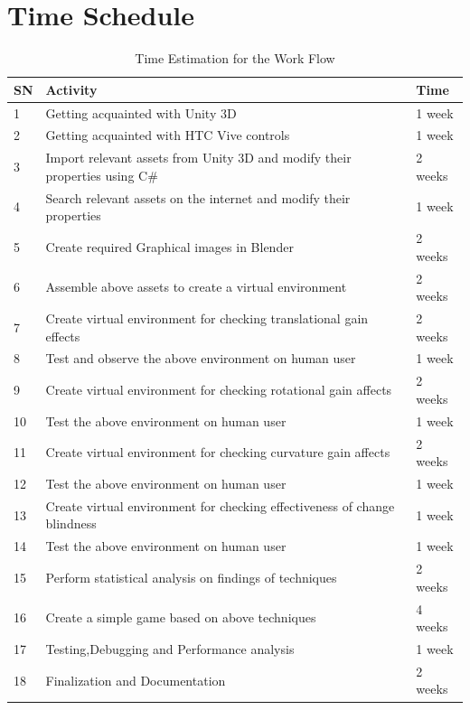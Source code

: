 \documentclass[12pt]{article}
\begin{document}
\section{Time Schedule}
\begin{table}[!ht]
\centering
\begin{tabular} { |l | l | l |}
\hline
SN & Activity & Time \\ \hline
1 & Getting acquainted with Unity 3D     &  1 week \\ \hline
2 & Getting acquainted with HTC Vive controls & 1 week \\ \hline
3 & Import relevant assets from Unity 3D and modify their properties using C\# &  2 weeks \\ \hline
4 & Search relevant assets on the internet and modify their properties & 1 week \\ \hline
5 & Create required Graphical images in Blender & 2 weeks \\ \hline
6 & Assemble above assets to create a virtual environment & 2 weeks \\ \hline
7 & Create virtual environment for checking translational gain effects & 2 weeks \\ \hline
8 & Test and observe the above environment on human user& 1 week \\ \hline
9 & Create virtual environment for checking rotational gain affects & 2 weeks \\ \hline
10 & Test the above environment on human user& 1 week \\ \hline
11 & Create virtual environment for checking curvature gain affects & 2 weeks \\ \hline
12 & Test the above environment on human user& 1 week \\ \hline
13& Create virtual environment for checking effectiveness of change blindness  & 1 week \\ \hline
14 & Test the above environment on human user& 1 week \\ \hline
15 & Perform statistical analysis on findings of techniques & 2 weeks \\ \hline
16 & Create a simple game based on above techniques & 4 weeks \\ \hline
17 & Testing,Debugging and Performance analysis & 1 week \\ \hline
18 & Finalization and Documentation & 2 weeks \\ \hline
\end{tabular}
\caption{Time Estimation for the Work Flow}
\end{table}
\end{document}
